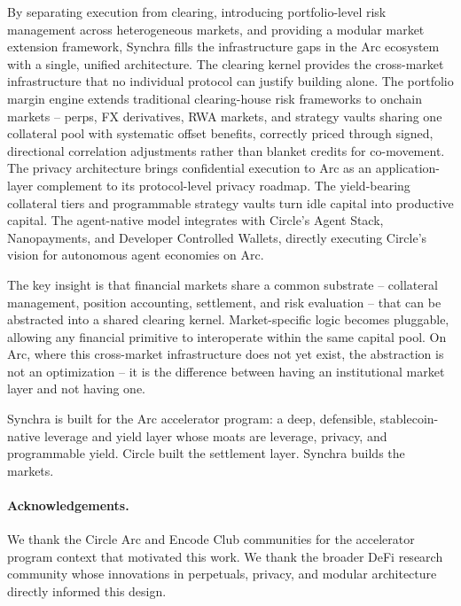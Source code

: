 \documentclass[11pt,a4paper]{article}
\begin{document}
By separating execution from clearing, introducing portfolio-level risk management across heterogeneous markets, and providing a modular market extension framework, Synchra fills the infrastructure gaps in the Arc ecosystem with a single, unified architecture. The clearing kernel provides the cross-market infrastructure that no individual protocol can justify building alone. The portfolio margin engine extends traditional clearing-house risk frameworks to onchain markets -- perps, FX derivatives, RWA markets, and strategy vaults sharing one collateral pool with systematic offset benefits, correctly priced through signed, directional correlation adjustments rather than blanket credits for co-movement. The privacy architecture brings confidential execution to Arc as an application-layer complement to its protocol-level privacy roadmap. The yield-bearing collateral tiers and programmable strategy vaults turn idle capital into productive capital. The agent-native model integrates with Circle's Agent Stack, Nanopayments, and Developer Controlled Wallets, directly executing Circle's vision for autonomous agent economies on Arc.

The key insight is that financial markets share a common substrate -- collateral management, position accounting, settlement, and risk evaluation -- that can be abstracted into a shared clearing kernel. Market-specific logic becomes pluggable, allowing any financial primitive to interoperate within the same capital pool. On Arc, where this cross-market infrastructure does not yet exist, the abstraction is not an optimization -- it is the difference between having an institutional market layer and not having one.

Synchra is built for the Arc accelerator program: a deep, defensible, stablecoin-native leverage and yield layer whose moats are leverage, privacy, and programmable yield. Circle built the settlement layer. Synchra builds the markets.

\paragraph{Acknowledgements.}
We thank the Circle Arc and Encode Club communities for the accelerator program context that motivated this work. We thank the broader DeFi research community whose innovations in perpetuals, privacy, and modular architecture directly informed this design.



\end{document}
